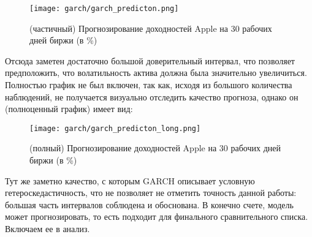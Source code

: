 \begin{figure}[H]
	\centering
	\texttt{[image: garch/garch\_predicton.png]}
	\caption{(частичный) Прогнозирование доходностей Apple на 30 рабочих дней биржи (в \%)}
\end{figure}

\noindent Отсюда заметен достаточно большой доверительный интервал, что позволяет предположить, что волатильность актива должна была значительно увеличиться. Полностью график не был включен, так как, исходя из большого количества наблюдений, не получается визуально отследить качество прогноза, однако он (полноценный график) имеет вид:
\begin{figure}[H]
	\centering
	\texttt{[image: garch/garch\_predicton\_long.png]}
	\caption{(полный) Прогнозирование доходностей Apple на 30 рабочих дней биржи (в \%)}
\end{figure}

\noindent Тут же заметно качество, с которым GARCH описывает условную гетероскедастичность, что не позволяет не отметить точность данной работы: большая часть интервалов соблюдена и обоснована. В конечно счете, модель может прогнозировать, то есть подходит для финального сравнительного списка. Включаем ее в анализ.